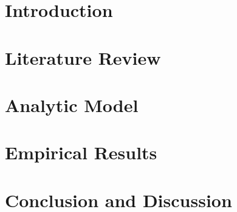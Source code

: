 \documentclass{ntuthesis}
\def\withwatermark{1}
\begin{document}
\frontmatter

\makecover

\ifdefined\excludefirstpage

  \def\withwatermark{1}
  \ifdefined\withwatermark
    \newsavebox\mybox
    \savebox{}
    \newwatermark*[allpages,xpos=6.1725cm,ypos=10.5225cm,scale=0.5]{\usebox\mybox}
  \fi

  \ifdefined\withdoi
    \insertdoi
  \fi
\fi


% 
% 


\mainmatter


\chapter{Introduction}
  \label{ch:intro}
\chapter{Literature Review} \label{ch:lit}
\chapter{Analytic Model} \label{ch:model}

\chapter{Empirical Results}  \label{ch:result}
\chapter{Conclusion and Discussion} \label{ch:conclusion}



\backmatter
{}
{}




%   
\end{document}
